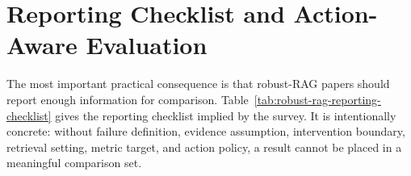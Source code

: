 \documentclass[11pt]{article}
\begin{document}


\section{Reporting Checklist and Action-Aware Evaluation}
\label{sec:evaluation}

The most important practical consequence is that robust-RAG papers should report enough information for comparison. Table~\ref{tab:robust-rag-reporting-checklist} gives the reporting checklist implied by the survey. It is intentionally concrete: without failure definition, evidence assumption, intervention boundary, retrieval setting, metric target, and action policy, a result cannot be placed in a meaningful comparison set.

\end{document}
